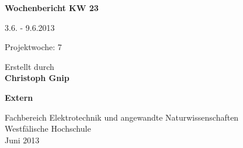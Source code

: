 
\begin{center}
{\Huge \textbf{Wochenbericht KW 23}\par}
\vspace{1cm}
{\Huge 3.6. - 9.6.2013\par}
\vspace{1cm}
{\Huge Projektwoche: 7\par}

\vspace{2cm}

\large{Erstellt durch}\\
\Large{\textbf{Christoph Gnip}}


\vspace{4cm}

\Large{\textbf{Extern}}

\vfill

{\normalsize Fachbereich Elektrotechnik und angewandte Naturwissenschaften\\
Westfälische Hochschule\\[2ex]Juni 2013}


\end{center}
\newpage